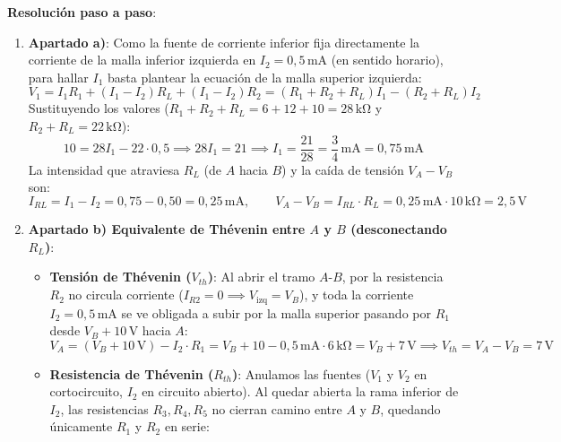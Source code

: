 \begin{ejercicio}
\textbf{Resolución paso a paso}:
\begin{enumerate}
    \item \textbf{Apartado a)}: Como la fuente de corriente inferior fija directamente la corriente de la malla inferior izquierda en $I_2 = 0{,}5\,\si{\milli\ampere}$ (en sentido horario), para hallar $I_1$ basta plantear la ecuación de la malla superior izquierda:
    \begin{equation*}
        V_1 = I_1 R_1 + (I_1 - I_2) R_L + (I_1 - I_2) R_2 = (R_1 + R_2 + R_L) I_1 - (R_2 + R_L) I_2
    \end{equation*}
    Sustituyendo los valores ($R_1 + R_2 + R_L = 6 + 12 + 10 = 28\,\si{\kilo\ohm}$ y $R_2 + R_L = 22\,\si{\kilo\ohm}$):
    \begin{equation*}
        10 = 28 I_1 - 22 \cdot 0{,}5 \implies 28 I_1 = 21 \implies I_1 = \frac{21}{28} = \frac{3}{4}\,\si{\milli\ampere} = 0{,}75\,\si{\milli\ampere}
    \end{equation*}
    La intensidad que atraviesa $R_L$ (de $A$ hacia $B$) y la caída de tensión $V_A - V_B$ son:
    \begin{equation*}
        \boxed{I_{RL} = I_1 - I_2 = 0{,}75 - 0{,}50 = 0{,}25\,\si{\milli\ampere}}, \qquad \boxed{V_A - V_B = I_{RL}\cdot R_L = 0{,}25\,\si{\milli\ampere}\cdot 10\,\si{\kilo\ohm} = 2{,}5\,\si{\volt}}
    \end{equation*}
    \item \textbf{Apartado b) Equivalente de Thévenin entre $A$ y $B$ (desconectando $R_L$)}:
    \begin{itemize}
        \item \textbf{Tensión de Thévenin ($V_{th}$)}: Al abrir el tramo $A$-$B$, por la resistencia $R_2$ no circula corriente ($I_{R2} = 0 \implies V_{\text{izq}} = V_B$), y toda la corriente $I_2 = 0{,}5\,\si{\milli\ampere}$ se ve obligada a subir por la malla superior pasando por $R_1$ desde $V_B + 10\,\si{\volt}$ hacia $A$:
        \begin{equation*}
            V_A = (V_B + 10\,\si{\volt}) - I_2 \cdot R_1 = V_B + 10 - 0{,}5\,\si{\milli\ampere}\cdot 6\,\si{\kilo\ohm} = V_B + 7\,\si{\volt} \implies \boxed{V_{th} = V_A - V_B = 7\,\si{\volt}}
        \end{equation*}
        \item \textbf{Resistencia de Thévenin ($R_{th}$)}: Anulamos las fuentes ($V_1$ y $V_2$ en cortocircuito, $I_2$ en circuito abierto). Al quedar abierta la rama inferior de $I_2$, las resistencias $R_3, R_4, R_5$ no cierran camino entre $A$ y $B$, quedando únicamente $R_1$ y $R_2$ en serie:

\end{itemize}
\end{enumerate}
\end{ejercicio}
